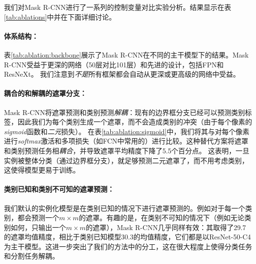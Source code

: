 我们对Mask R-CNN进行了一系列的控制变量对比实验分析。结果显示在表\ref{tab:ablations}中并在下面详细讨论。

\paragraph{体系结构：} 表\ref{tab:ablation:backbone}展示了Mask R-CNN在不同的主干模型下的结果。Mask R-CNN受益于更深的网络（50层对比101层）和先进的设计，包括FPN和ResNeXt。 我们注意到\emph{不是}所有框架都会自动从更深或更高级的网络中受益。

\paragraph{耦合的和解耦的遮罩分支：} Mask R-CNN将遮罩预测和类别预测\emph{解耦}：现有的边界框分支已经可以预测类别标签，因此我们为每个类别生成一个遮罩，而不会造成类别的冲突（由于每个像素的\emph{sigmoid}函数和\emph{二元}损失）。 在表\ref{tab:ablation:sigmoid}中，我们将其与对每个像素进行\emph{softmax}激活和多项损失（如FCN中常用的）进行比较。这种替代方案将遮罩和类别预测任务相\emph{耦合}，并导致遮罩平均精度下降了5.5个百分点。 这表明，一旦实例被整体分类（通过边界框分支），就足够预测二元遮罩了，而不用考虑类别，这使得模型更易于训练。

\paragraph{类别已知和类别不可知的遮罩预测：} 我们默认的实例化模型是在类别已知的情况下进行遮罩预测的。例如对于每一个类别，都会预测一个$m\times m$的遮罩。有趣的是，在类别不可知的情况下（例如无论类别如何，只输出一个$m\times m$的遮罩），Mask R-CNN几乎同样有效：其取得了29.7的遮罩均值精度，相比于类别已知模型30.3的均值精度，它们都是以ResNet-50-C4为主干模型。这进一步突出了我们的方法中的分工，这在很大程度上使得分类任务和分割任务解耦。

